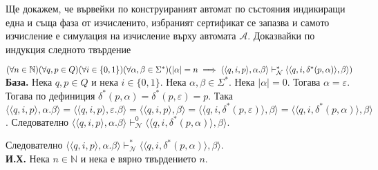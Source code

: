 \documentclass[12pt]{article}
\begin{document}
Ще докажем, че вървейки по конструираният автомат по състояния индикиращи една и съща фаза от изчисленито, избраният сертификат се запазва и самото изчисление е симулация на изчисление върху автомата \(\mathcal A\). Доказвайки по индукция следното твърдение

\((\forall n \in \mathbb N)(\forall q, p \in Q)(\forall i \in \{0, 1\})(\forall \alpha, \beta \in \Sigma^*)\\
(|\alpha| = n \implies \langle \langle q, i, p \rangle, \alpha.\beta \rangle \vdash_{\mathcal N}^* \langle \langle q, i, \delta^*(p, \alpha) \rangle, \beta \rangle )\) \\

\textbf{База.}
Нека \(q, p \in Q\) и нека \(i \in \{0, 1\}\).
Нека \(\alpha, \beta \in \Sigma^*\). Нека \(|\alpha| = 0\).
Тогава \(\alpha = \varepsilon\). Тогава по дефиниция \(\delta^*(p, \alpha) = \delta^*(p, \varepsilon) = p\). Така \(\langle \langle q, i, p \rangle, \alpha.\beta \rangle = \langle \langle q, i, p \rangle, \varepsilon.\beta \rangle = \langle \langle q, i, p \rangle, \beta \rangle = \langle \langle q, i, \delta^*(p, \varepsilon) \rangle, \beta \rangle = \langle \langle q, i, \delta^*(p, \alpha) \rangle, \beta \rangle\). Следователно \(\langle \langle q, i, p \rangle, \alpha.\beta \rangle \vdash_{\mathcal N}^0 \langle \langle q, i, \delta^*(p, \alpha) \rangle, \beta \rangle\).

Следователно \(\langle \langle q, i, p \rangle, \alpha.\beta \rangle \vdash_{\mathcal N}^* \langle \langle q, i, \delta^*(p, \alpha) \rangle, \beta \rangle\). \\

\textbf{И.Х.}
Нека \(n \in \mathbb N\) и нека е вярно твърдението \(n\). \\
\end{document}
